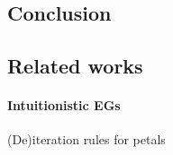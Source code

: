 \begin{scope}


\section{Conclusion}

\subsection{Related works}

\paragraph{Intuitionistic EGs}
  
\begin{marginfigure}
  \caption{(De)iteration rules for petals}
\end{marginfigure}


\end{scope}
